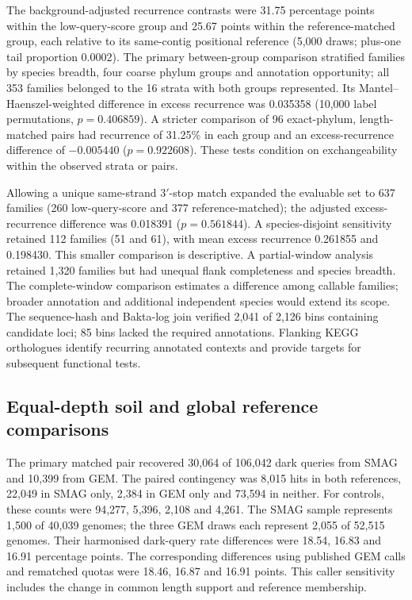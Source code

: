 \documentclass[11pt]{article}
\begin{document}
The background-adjusted recurrence contrasts were 31.75 percentage points within the
low-query-score group and 25.67 points within the reference-matched group, each relative to
its same-contig positional reference (5{,}000 draws; plus-one tail proportion 0.0002).
The primary between-group comparison stratified families by species breadth, four coarse
phylum groups and annotation opportunity; all 353 families belonged to the 16 strata with
both groups represented. Its Mantel--Haenszel-weighted difference in excess recurrence was
0.035358 (10{,}000 label permutations, $p=0.406859$). A stricter comparison of 96 exact-phylum,
length-matched pairs had recurrence of 31.25\% in each group and an excess-recurrence difference
of $-0.005440$ ($p=0.922608$). These tests condition on exchangeability within the observed
strata or pairs.

Allowing a unique same-strand 3$'$-stop match expanded the evaluable set to 637 families
(260 low-query-score and 377 reference-matched); the adjusted excess-recurrence difference
was 0.018391 ($p=0.561844$). A species-disjoint sensitivity retained 112 families
(51 and 61), with mean excess recurrence 0.261855 and 0.198430. This smaller comparison is
descriptive. A partial-window analysis retained 1{,}320 families but had unequal flank
completeness and species breadth. The complete-window comparison estimates a difference among
callable families; broader annotation and additional independent species would extend its scope.
The sequence-hash and Bakta-log join verified 2{,}041 of 2{,}126 bins containing candidate loci;
85 bins lacked the required annotations. Flanking KEGG orthologues identify recurring annotated
contexts and provide targets for subsequent functional tests.

\subsection*{Equal-depth soil and global reference comparisons}
The primary matched pair recovered 30{,}064 of 106{,}042 dark queries from SMAG and 10{,}399
from GEM. The paired contingency was 8{,}015 hits in both references, 22{,}049 in SMAG only,
2{,}384 in GEM only and 73{,}594 in neither. For controls, these counts were 94{,}277,
5{,}396, 2{,}108 and 4{,}261. The SMAG sample represents 1{,}500 of 40{,}039 genomes;
the three GEM draws each represent 2{,}055 of 52{,}515 genomes. Their harmonised dark-query
rate differences were 18.54, 16.83 and 16.91 percentage points. The corresponding differences
using published GEM calls and rematched quotas were 18.46, 16.87 and 16.91 points.
This caller sensitivity includes the change in common length support and reference membership.
\end{document}
